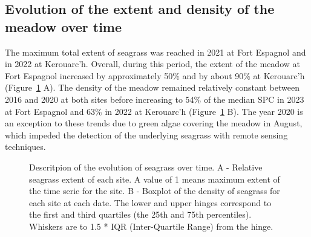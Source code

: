 \documentclass[
  number]{elsarticle}
\begin{document}
\subsection{Evolution of the extent and density of the meadow over
time}\label{evolution-of-the-extent-and-density-of-the-meadow-over-time}

The maximum total extent of seagrass was reached in 2021 at Fort
Espagnol and in 2022 at Kerouarc'h. Overall, during this period, the
extent of the meadow at Fort Espagnol increased by approximately 50\%
and by about 90\% at Kerouarc'h (Figure~\ref{fig-Extent} A). The density
of the meadow remained relatively constant between 2016 and 2020 at both
sites before increasing to 54\% of the median SPC in 2023 at Fort
Espagnol and 63\% in 2022 at Kerouarc'h (Figure~\ref{fig-Extent} B). The
year 2020 is an exception to these trends due to green algae covering
the meadow in August, which impeded the detection of the underlying
seagrass with remote sensing techniques.

\label{cell-fig-Extent}
\begin{figure}[H]


\caption{\label{fig-Extent}Descritpion of the evolution of seagrass over
time. A - Relative seagrass extent of each site. A value of 1 means
maximum extent of the time serie for the site. B - Boxplot of the
density of seagrass for each site at each date. The lower and upper
hinges correspond to the first and third quartiles (the 25th and 75th
percentiles). Whiskers are to 1.5 * IQR (Inter-Quartile Range) from the
hinge.}

\end{figure}%
\end{document}
